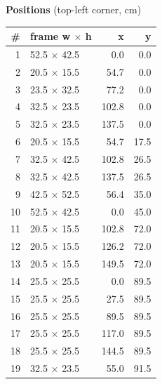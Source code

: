 \documentclass[a4paper,landscape,10pt]{article}
\begin{document}
\begin{minipage}[t]{0.25\textwidth}
\vspace{8pt}
{\bfseries Positions} (top-left corner, cm)\\[2pt]
\tiny
\begin{tabular}{@{}r l r r@{}}
\toprule
\# & frame w $\times$ h & x & y \\
\midrule
1 & 52.5 $\times$ 42.5 & 0.0 & 0.0 \\
2 & 20.5 $\times$ 15.5 & 54.7 & 0.0 \\
3 & 23.5 $\times$ 32.5 & 77.2 & 0.0 \\
4 & 32.5 $\times$ 23.5 & 102.8 & 0.0 \\
5 & 32.5 $\times$ 23.5 & 137.5 & 0.0 \\
6 & 20.5 $\times$ 15.5 & 54.7 & 17.5 \\
7 & 32.5 $\times$ 42.5 & 102.8 & 26.5 \\
8 & 32.5 $\times$ 42.5 & 137.5 & 26.5 \\
9 & 42.5 $\times$ 52.5 & 56.4 & 35.0 \\
10 & 52.5 $\times$ 42.5 & 0.0 & 45.0 \\
11 & 20.5 $\times$ 15.5 & 102.8 & 72.0 \\
12 & 20.5 $\times$ 15.5 & 126.2 & 72.0 \\
13 & 20.5 $\times$ 15.5 & 149.5 & 72.0 \\
14 & 25.5 $\times$ 25.5 & 0.0 & 89.5 \\
15 & 25.5 $\times$ 25.5 & 27.5 & 89.5 \\
16 & 25.5 $\times$ 25.5 & 89.5 & 89.5 \\
17 & 25.5 $\times$ 25.5 & 117.0 & 89.5 \\
18 & 25.5 $\times$ 25.5 & 144.5 & 89.5 \\
19 & 32.5 $\times$ 23.5 & 55.0 & 91.5 \\
\bottomrule
\end{tabular}
\end{minipage}
\clearpage
\end{document}
